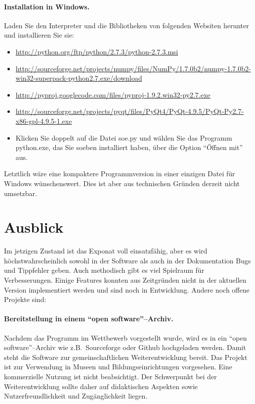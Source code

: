 \documentclass[a4paper,12pt]{article}
\begin{document}
\paragraph{Installation in Windows.} Laden Sie den Interpreter und die Bibliotheken
           von folgenden Websiten herunter und installieren Sie sie:
\begin{itemize}
 \item \url{http://python.org/ftp/python/2.7.3/python-2.7.3.msi}
 \item \url{http://sourceforge.net/projects/numpy/files/NumPy/1.7.0b2/numpy-1.7.0b2-win32-superpack-python2.7.exe/download}
 \item \url{http://pyproj.googlecode.com/files/pyproj-1.9.2.win32-py2.7.exe}
 \item \url{http://sourceforge.net/projects/pyqt/files/PyQt4/PyQt-4.9.5/PyQt-Py2.7-x86-gpl-4.9.5-1.exe}
 \item Klicken Sie doppelt auf die Datei soe.py und wählen Sie das Programm
       python.exe, das Sie soeben installiert haben, über die Option "`Öffnen mit"' aus.
\end{itemize}

Letztlich wäre eine kompaktere Programmversion in einer einzigen Datei für Windows
wünschenswert. Dies ist aber aus technischen Gründen derzeit nicht umsetzbar.


\section{Ausblick}

Im jetzigen Zustand ist das Exponat voll einsatzfähig, aber es wird 
höchst\-wahr\-schein\-lich sowohl in der Software als auch in der Dokumentation Bugs 
und Tippfehler geben. Auch methodisch gibt es viel Spielraum für Verbesserungen.
Einige Features konnten aus Zeitgründen nicht in der aktuellen Version implementiert
werden und sind noch in Entwicklung. Andere noch offene Projekte sind:

\paragraph{Bereitstellung in einem "`open software"'--Archiv.} 
Nachdem das Programm im Wettbewerb vorgestellt wurde, wird es in ein 
"`open software"'--Archiv wie z.B.\ Sourceforge oder Github hochgeladen werden. Damit
steht die Software zur gemeinschaftlichen Weiterentwicklung bereit. Das Projekt ist 
zur Verwendung in Museen und Bildungseinrichtungen vorgesehen. Eine kommerzielle 
Nutzung ist nicht beabsichtigt. Der Schwerpunkt bei der Weiterentwicklung sollte daher 
auf didaktischen Aspekten sowie Nutzerfreundlichkeit und Zugänglichkeit liegen.
\end{document}
